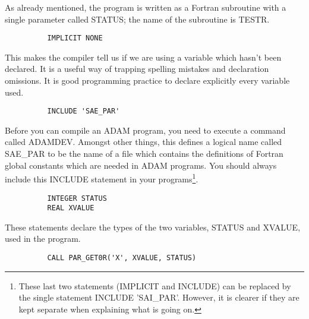 As already mentioned, the program is written as a Fortran subroutine with a
single parameter called STATUS; the name of the subroutine is TESTR.

\begin{small}
\begin{verbatim}
          IMPLICIT NONE
\end{verbatim}
\end{small}

This makes the compiler tell us if we are using a variable which hasn't been
declared.
It is a useful way of trapping spelling mistakes and declaration omissions.
It is good programming practice to declare explicitly every variable used.

\begin{small}
\begin{verbatim}
          INCLUDE 'SAE_PAR'
\end{verbatim}
\end{small}

Before you can compile an ADAM program, you need to execute a command called
ADAMDEV.
Amongst other things, this defines a logical name called SAE\_PAR to be the name
of a file which contains the definitions of Fortran global constants which are
needed in ADAM programs.
You should always include this INCLUDE statement in your
programs\footnote{These last two statements (IMPLICIT and INCLUDE) can be
replaced by the single statement INCLUDE 'SAI\_PAR'.
However, it is clearer if they are kept separate when explaining what is going
on.}.

\begin{small}
\begin{verbatim}
          INTEGER STATUS
          REAL XVALUE
\end{verbatim}
\end{small}

These statements declare the types of the two variables, STATUS and XVALUE,
used in the program.

\begin{small}
\begin{verbatim}
          CALL PAR_GET0R('X', XVALUE, STATUS)
\end{verbatim}
\end{small}

